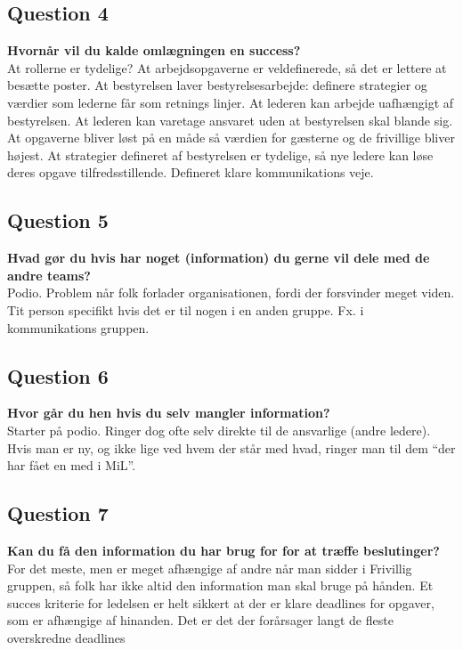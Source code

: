 \subsection{Question 4}
\label{i4q4}
\noindent \textbf{Hvornår vil du kalde omlægningen en success?} \\
At rollerne er tydelige? At arbejdsopgaverne er veldefinerede, så det er lettere at besætte poster. At bestyrelsen laver bestyrelsesarbejde: definere strategier og værdier som lederne får som retnings linjer. At lederen kan arbejde uafhængigt af bestyrelsen. At lederen kan varetage ansvaret uden at bestyrelsen skal blande sig. At opgaverne bliver løst på en måde så værdien for gæsterne og de frivillige bliver højest. At strategier defineret af bestyrelsen er tydelige, så nye ledere kan løse deres opgave tilfredsstillende. Defineret klare kommunikations veje.

\subsection{Question 5}
\label{i4q5}
\noindent \textbf{Hvad gør du hvis har noget (information) du gerne vil dele med de andre teams?} \\
Podio. Problem når folk forlader organisationen, fordi der forsvinder meget viden. Tit person specifikt hvis det er til nogen i en anden gruppe. Fx. i kommunikations gruppen.

\subsection{Question 6}
\label{i4q6}
\noindent \textbf{Hvor går du hen hvis du selv mangler information?} \\
Starter på podio. Ringer dog ofte selv direkte til de ansvarlige (andre ledere). Hvis man er ny, og ikke lige ved hvem der står med hvad, ringer man til dem “der har fået en med i MiL”.


\subsection{Question 7}
\label{i4q7}
\noindent \textbf{Kan du få den information du har brug for for at træffe beslutinger?} \\
For det meste, men er meget afhængige af andre når man sidder i Frivillig gruppen, så folk har ikke altid den information man skal bruge på hånden. 
Et succes kriterie for ledelsen er helt sikkert at der er klare deadlines for opgaver, som er afhængige af hinanden. Det er det der forårsager langt de fleste overskredne deadlines

